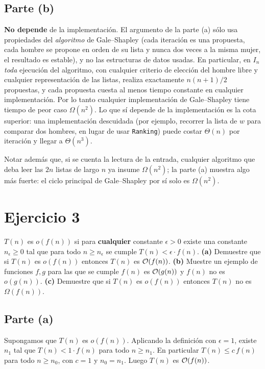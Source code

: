 \subsection*{Parte (b)}
\textbf{No depende} de la implementación. El argumento de la parte (a) sólo usa propiedades del
\emph{algoritmo} de Gale--Shapley (cada iteración es una propuesta, cada hombre se propone en
orden de su lista y nunca dos veces a la misma mujer, el resultado es estable), y no las
estructuras de datos usadas. En particular, en $I_n$ \emph{toda} ejecución del algoritmo, con
cualquier criterio de elección del hombre libre y cualquier representación de las listas,
realiza exactamente $n(n+1)/2$ propuestas, y cada propuesta cuesta al menos tiempo constante en
cualquier implementación. Por lo tanto cualquier implementación de Gale--Shapley tiene tiempo de
peor caso $\Omega(n^2)$. Lo que sí depende de la implementación es la cota superior: una
implementación descuidada (por ejemplo, recorrer la lista de $w$ para comparar dos hombres, en
lugar de usar \texttt{Ranking}) puede costar $\Theta(n)$ por iteración y llegar a $\Theta(n^3)$.

Notar además que, si se cuenta la lectura de la entrada, cualquier algoritmo que deba leer las
$2n$ listas de largo $n$ ya insume $\Omega(n^2)$; la parte (a) muestra algo más fuerte: el ciclo
principal de Gale--Shapley por sí solo es $\Omega(n^2)$.

\section{Ejercicio 3}

\begin{enunciado}
$T(n)$ es $o(f(n))$ si para \textbf{cualquier} constante $\epsilon>0$ existe una constante
$n_\epsilon\ge 0$ tal que para todo $n\ge n_\epsilon$ se cumple $T(n)<\epsilon\cdot f(n)$.
\textbf{(a)} Demuestre que si $T(n)$ es $o(f(n))$ entonces $T(n)$ es $\mathcal{O}(f(n))$.
\textbf{(b)} Muestre un ejemplo de funciones $f,g$ para las que se cumple $f(n)$ es
$\mathcal{O}(g(n))$ y $f(n)$ no es $o(g(n))$.
\textbf{(c)} Demuestre que si $T(n)$ es $o(f(n))$ entonces $T(n)$ no es $\Omega(f(n))$.
\end{enunciado}

\subsection*{Parte (a)}
Supongamos que $T(n)$ es $o(f(n))$. Aplicando la definición con $\epsilon=1$, existe $n_1$ tal
que $T(n)<1\cdot f(n)$ para todo $n\ge n_1$. En particular $T(n)\le c\,f(n)$ para todo
$n\ge n_0$, con $c=1$ y $n_0=n_1$. Luego $T(n)$ es $\mathcal{O}(f(n))$.


